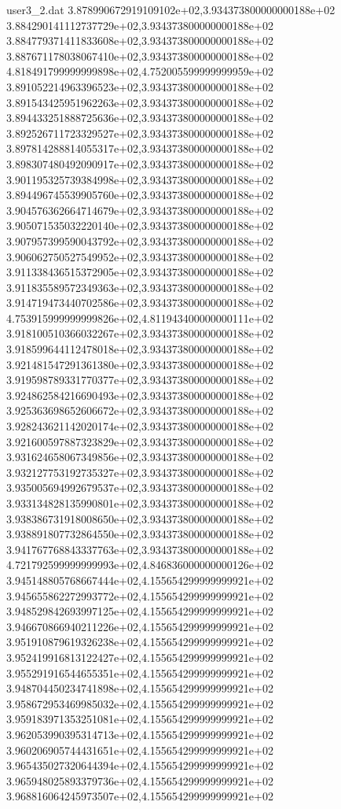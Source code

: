 \begin{filecontents}{user3_2.dat}
3.878990672919109102e+02,3.934373800000000188e+02
3.884290141112737729e+02,3.934373800000000188e+02
3.884779371411833608e+02,3.934373800000000188e+02
3.887671178038067410e+02,3.934373800000000188e+02
4.818491799999999898e+02,4.752005599999999959e+02
3.891052214963396523e+02,3.934373800000000188e+02
3.891543425951962263e+02,3.934373800000000188e+02
3.894433251888725636e+02,3.934373800000000188e+02
3.892526711723329527e+02,3.934373800000000188e+02
3.897814288814055317e+02,3.934373800000000188e+02
3.898307480492090917e+02,3.934373800000000188e+02
3.901195325739384998e+02,3.934373800000000188e+02
3.894496745539905760e+02,3.934373800000000188e+02
3.904576362664714679e+02,3.934373800000000188e+02
3.905071535032220140e+02,3.934373800000000188e+02
3.907957399590043792e+02,3.934373800000000188e+02
3.906062750527549952e+02,3.934373800000000188e+02
3.911338436515372905e+02,3.934373800000000188e+02
3.911835589572349363e+02,3.934373800000000188e+02
3.914719473440702586e+02,3.934373800000000188e+02
4.753915999999999826e+02,4.811943400000000111e+02
3.918100510366032267e+02,3.934373800000000188e+02
3.918599644112478018e+02,3.934373800000000188e+02
3.921481547291361380e+02,3.934373800000000188e+02
3.919598789331770377e+02,3.934373800000000188e+02
3.924862584216690493e+02,3.934373800000000188e+02
3.925363698652606672e+02,3.934373800000000188e+02
3.928243621142020174e+02,3.934373800000000188e+02
3.921600597887323829e+02,3.934373800000000188e+02
3.931624658067349856e+02,3.934373800000000188e+02
3.932127753192735327e+02,3.934373800000000188e+02
3.935005694992679537e+02,3.934373800000000188e+02
3.933134828135990801e+02,3.934373800000000188e+02
3.938386731918008650e+02,3.934373800000000188e+02
3.938891807732864550e+02,3.934373800000000188e+02
3.941767768843337763e+02,3.934373800000000188e+02
4.721792599999999993e+02,4.846836000000000126e+02
3.945148805768667444e+02,4.155654299999999921e+02
3.945655862272993772e+02,4.155654299999999921e+02
3.948529842693997125e+02,4.155654299999999921e+02
3.946670866940211226e+02,4.155654299999999921e+02
3.951910879619326238e+02,4.155654299999999921e+02
3.952419916813122427e+02,4.155654299999999921e+02
3.955291916544655351e+02,4.155654299999999921e+02
3.948704450234741898e+02,4.155654299999999921e+02
3.958672953469985032e+02,4.155654299999999921e+02
3.959183971353251081e+02,4.155654299999999921e+02
3.962053990395314713e+02,4.155654299999999921e+02
3.960206905744431651e+02,4.155654299999999921e+02
3.965435027320644394e+02,4.155654299999999921e+02
3.965948025893379736e+02,4.155654299999999921e+02
3.968816064245973507e+02,4.155654299999999921e+02

\end{filecontents}
